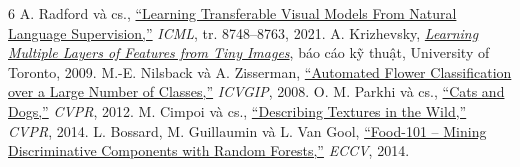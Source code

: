 \documentclass[11pt,a4paper]{article}
\begin{document}
\begingroup
\small
\begin{thebibliography}{6}
\setlength{\itemsep}{0pt}\setlength{\parskip}{0pt}
 A. Radford và cs., \href{https://proceedings.mlr.press/v139/radford21a.html}{``Learning Transferable Visual Models From Natural Language Supervision,''} \emph{ICML}, tr. 8748--8763, 2021.
 A. Krizhevsky, \href{https://www.cs.toronto.edu/~kriz/learning-features-2009-TR.pdf}{\emph{Learning Multiple Layers of Features from Tiny Images}}, báo cáo kỹ thuật, University of Toronto, 2009.
 M.-E. Nilsback và A. Zisserman, \href{https://www.robots.ox.ac.uk/~vgg/data/flowers/102/}{``Automated Flower Classification over a Large Number of Classes,''} \emph{ICVGIP}, 2008.
 O. M. Parkhi và cs., \href{https://www.robots.ox.ac.uk/~vgg/data/pets/}{``Cats and Dogs,''} \emph{CVPR}, 2012.
 M. Cimpoi và cs., \href{https://www.robots.ox.ac.uk/~vgg/data/dtd/}{``Describing Textures in the Wild,''} \emph{CVPR}, 2014.
 L. Bossard, M. Guillaumin và L. Van Gool, \href{https://data.vision.ee.ethz.ch/cvl/datasets_extra/food-101/}{``Food-101 -- Mining Discriminative Components with Random Forests,''} \emph{ECCV}, 2014.
\end{thebibliography}
\endgroup
\end{document}
